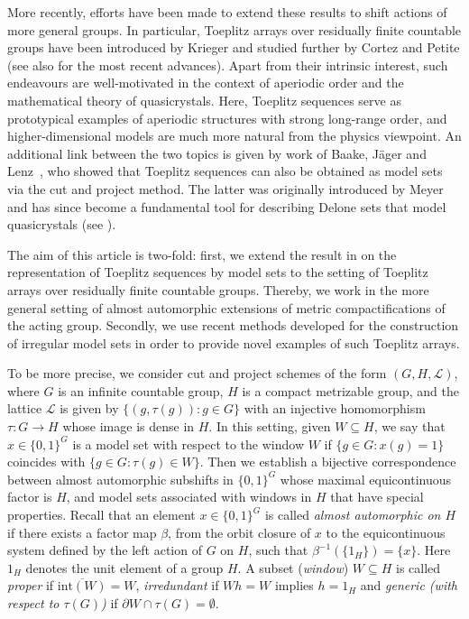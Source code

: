 \documentclass[titlepage,reqno,10pt]{amsart}
\theoremstyle{definition}
\begin{document}
More recently, efforts have been made to extend these results to shift actions of more general groups. In particular, Toeplitz arrays over residually finite countable groups have been introduced by Krieger \cite{Kr10} and studied further by Cortez and Petite \cite{CoPe08,CoPe14} (see also \cite{CeCoGo23,CoGo24} for the most recent advances). Apart from their intrinsic interest, such endeavours are well-motivated in the context of aperiodic order and the mathematical theory of quasicrystals. Here, Toeplitz sequences serve as prototypical examples of aperiodic structures with strong long-range order, and higher-dimensional models are much more natural from the physics viewpoint. 
An additional link between the two topics is given by work of Baake, J\"ager and Lenz~\cite{BaJäLe16}, who showed that Toeplitz sequences can also be obtained as model sets via the cut and project method. The latter was originally introduced by Meyer \cite{Mey72} and has since become a fundamental tool for describing Delone sets that model quasicrystals (see \cite{BaLeMo07, DJL, JLO19, LP03, Mo97}). 

The aim of this article is two-fold: first, we extend the result in \cite{BaJäLe16} on the representation of Toeplitz sequences by model sets to the setting of Toeplitz arrays over residually finite countable groups. Thereby, we work in the more general setting of almost automorphic extensions of metric compactifications of the acting group. Secondly, we use recent methods developed for the construction of irregular model sets \cite{FuGlJäOe21, JLO19} in order to provide novel examples of such Toeplitz arrays. \smallskip

To be more precise, we consider cut and project schemes of the form \((G, H, \mathcal{L})\), where \(G\) is an infinite countable group, \(H\) is a compact metrizable group, and the lattice \(\mathcal{L}\) is given by  $\{(g, \tau(g)) : g \in G\}$ with an injective homomorphism \(\tau: G \to H\) whose image is dense in \(H\). In this setting, given $W\subseteq H$, we say that $x\in \{0,1\}^G$ is a model set with respect to the window $W$ if $\{g\in G: x(g)=1\}$ coincides with $\{g\in G: \tau(g)\in W\}$. 
Then we establish a bijective correspondence between almost automorphic subshifts in $\{0,1\}^G$ whose maximal equicontinuous factor is $H$, and model sets associated with windows in $H$ that have special properties. Recall that an element $x \in \{0,1\}^G$ is called {\it almost automorphic on $H$} if there exists a factor map $\beta$, from the orbit closure of $x$ to the equicontinuous system defined by the left action of $G$ on $H$, such that $\beta^{-1}(\{1_H\}) = \{x\}$. Here $1_H$ denotes the unit element of a group $H$. A subset (\textit{window}) $W\subseteq H$ is called \textit{proper} if $\overline{\mathrm{int}(W)}=W$, \textit{irredundant} if $Wh=W$ implies $h=1_H$ and \textit{generic (with respect to $\tau(G)$)} if $\partial W\cap \tau(G)=\emptyset$.  \newpage
\end{document}
